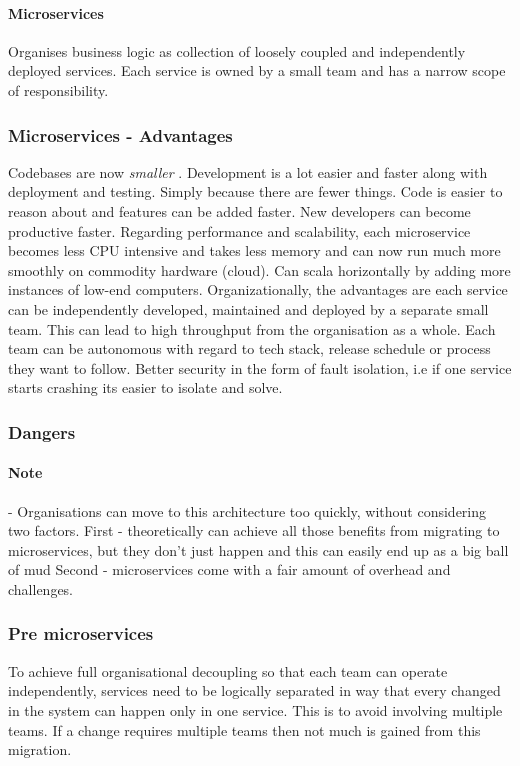 \documentclass[a4paper, 11pt]{book}
\begin{document}
    \paragraph{Microservices}
    Organises business logic as collection of loosely coupled and independently deployed services.
    Each service is owned by a small team and has a narrow scope of responsibility.

    \subsubsection{Microservices - Advantages}
    Codebases are now \textit{smaller} .
    Development is a lot easier and faster along with deployment and testing.
    Simply because there are fewer things.
    Code is easier to reason about and features can be added faster.
    New developers can become productive faster.
    Regarding performance and scalability, each microservice becomes less CPU intensive and takes less memory and can now run much more smoothly on commodity hardware (cloud).
    Can scala horizontally by adding more instances of low-end computers.
    Organizationally, the advantages are each service can be independently developed, maintained and deployed by a separate small team.
    This can lead to high throughput from the organisation as a whole.
    Each team can be autonomous with regard to tech stack, release schedule or process they want to follow.
    Better security in the form of fault isolation, i.e if one service starts crashing its easier to isolate and solve.

    \subsubsection{Dangers}
    \paragraph{Note} - Organisations can move to this architecture too quickly, without considering two factors.
    First - theoretically can achieve all those benefits from migrating to microservices, but they don't just happen and this can easily end up as a big ball of mud
    Second - microservices come with a fair amount of overhead and challenges.

    \subsubsection{Pre microservices}
    To achieve full organisational decoupling so that each team can operate independently, services need to be logically separated in way that every changed in the system can happen only in one service.
    This is to avoid involving multiple teams.
    If a change requires multiple teams then not much is gained from this migration.
\end{document}
